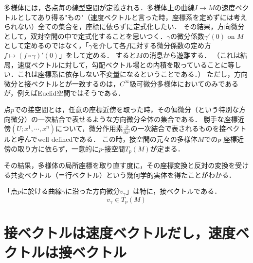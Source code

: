 \documentclass[uplatex, dvipdfmx]{jsreport}
\begin{document}
\begin{screen}
    多様体には，各点毎の線型空間が定義される．多様体上の曲線$I\to M$の速度ベクトルとしてあり得る"もの"（速度ベクトルと言った時，座標系を定めずには考えられない）全ての集合を，座標に依らずに定式化したい．
    その結果，方向微分として，双対空間の中で定式化することを思いつく．$\gamma$の微分係数$\gamma'(0)$ on $M$として定めるのではなく，「$\gamma$を介して各$f$に対する微分係数の定め方$f\mapsto (f\circ\gamma)'(0)$」をして定める．
    すると$M$の消息から遊離する．
    （これは結局，速度ベクトルに対して，勾配ベクトル場との内積を取っていることに等しい．これは座標系に依存しない不変量になるということである．）
    ただし，方向微分と接ベクトルとが一致するのは，$C^\infty$級可微分多様体においてのみであるが，例えばEuclid空間ではそうである．

    点$p$での接空間とは，任意の座標近傍を取った時，その偏微分（という特別な方向微分）の一次結合で表せるような方向微分全体の集合である．
    勝手な座標近傍$(U;x^1,\cdots, x^n)$について，微分作用素$\frac{\partial}{\partial x^i}$の一次結合で表されるものを接ベクトルと呼んでwell-definedである．
    この時，接空間の元々の多様体$M$での$p$-座標近傍の取り方に依らず，一意的に$p$-接空間$T_p(M)$が定まる．

    その結果，多様体の局所座標を取り直す度に，その座標変換と反対の変換を受ける共変ベクトル（＝行ベクトル）という幾何学的実体を得たことがわかる．
\end{screen}

\begin{proposition}
    「点$p$に於ける曲線$\gamma$に沿った方向微分$v_\gamma$」は特に，接ベクトルである．
    \[v_\gamma\in T_p(M)\]
\end{proposition}

\section{接ベクトルは速度ベクトルだし，速度ベクトルは接ベクトル}
\end{document}
